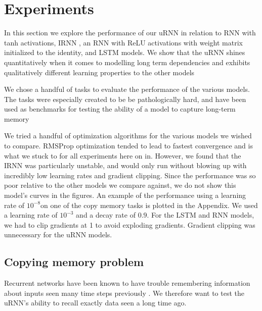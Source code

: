 \documentclass{article} %
\begin{document}
\section{Experiments}

In this section we explore the performance of our uRNN in relation to RNN with tanh activations,
IRNN \citep{Quoc2015}, an RNN with ReLU activations with weight matrix initialized to the identity, 
and LSTM \citep{LSTM} models. We show that the uRNN shines quantitatively when it comes to modelling 
long term dependencies and exhibits qualitatively different learning properties to the other models 
 
We chose a handful of tasks to evaluate the performance of the various models.
The tasks were especially created to be be pathologically hard, and have been used 
as benchmarks for testing the ability of a model to capture long-term memory \citep{LSTM} \citep{Quoc2015} \citep{NTM}
\citep{HF}

We tried a handful of optimization algorithms for the various models we wished to compare. 
RMSProp optimization \citep{RMSPROP} tended to lead to fastest convergence and is what we stuck to for all
experiments here on in. However, we found that the IRNN was particularly unstable, and would only run without 
blowing up with incredibly low learning rates and gradient clipping. Since the performance was so poor
relative to the other models we compare against, we do not show this model's curves in the figures. An example of the
performance using a learning rate of $10^{-8} $on one of the copy memory tasks is plotted in the Appendix. 
We used a learning rate of $10^{-3}$
and a decay rate of $0.9$. For the LSTM and RNN models, we had to clip gradients at 1 to avoid exploding 
gradients. Gradient clipping was unnecessary for the uRNN models.


\subsection{Copying memory problem}

Recurrent networks have been known to have trouble remembering information about inputs seen
many time steps previously \citep{Yoshua94, Pascanu2013}. 
We therefore want to test the uRNN's ability to recall exactly data seen a long time ago.
\end{document}
